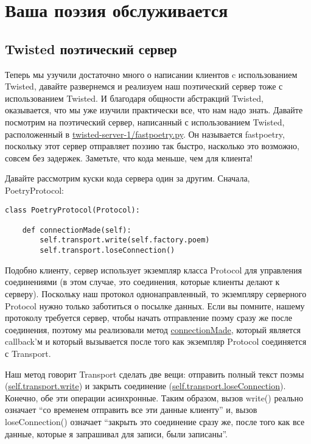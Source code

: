 

\section{Ваша поэзия обслуживается\label{sec:part11}}

\subsection{Twisted поэтический сервер}


Теперь мы узучили достаточно много о написании клиентов c 
использованием Twisted, давайте развернемся и реализуем наш 
поэтический сервер тоже с использованием Twisted. И благодаря 
общности абстракций Twisted, оказывается, что  
мы уже изучили практически все, что нам надо знать. Давайте 
посмотрим на поэтический сервер, написанный с использованием 
Twisted, расположенный в \href{http://github.com/jdavisp3/twisted-intro/blob/master/twisted-server-1/fastpoetry.py#L1}{twisted-server-1/fastpoetry.py}. Он называется fastpoetry, 
поскольку этот сервер отправляет поэзию так быстро, 
насколько это возможно, совсем без задержек. Заметьте, что 
кода меньше, чем для клиента!


Давайте рассмотрим куски кода сервера один за другим. Сначала, PoetryProtocol:

 \begin{verbatim}
class PoetryProtocol(Protocol):

    def connectionMade(self):
        self.transport.write(self.factory.poem)
        self.transport.loseConnection()
\end{verbatim} 


Подобно клиенту, сервер использует экземпляр класса Protocol 
для управления соединениями (в этом случае, это соединения, 
которые клиенты делают к серверу). Поскольку наш протокол 
однонаправленный, то экземпляру серверного Protocol нужно 
только заботиться о посылке данных. Если вы помните, нашему  
протоколу требуется сервер, чтобы начать отправление поэму 
сразу же после соединения, поэтому мы реализовали метод 
\href{http://twistedmatrix.com/trac/browser/tags/releases/twisted-8.2.0/twisted/internet/protocol.py#L351}{connectionMade}, который является callback'м и который вызывается 
после того как экземпляр Protocol 
соединяется с Transport.  


Наш метод говорит Transport сделать две вещи: отправить полный текст поэмы (\href{http://twistedmatrix.com/trac/browser/tags/releases/twisted-8.2.0/twisted/internet/interfaces.py#L1302}{self.transport.write}) и закрыть соединение \newline (\href{http://twistedmatrix.com/trac/browser/tags/releases/twisted-8.2.0/twisted/internet/interfaces.py#L1321}{self.transport.loseConnection}). Конечно, обе 
эти операции асинхронные. Таким образом, вызов write() реально означает ``со временем отправить все 
эти данные клиенту'' и, вызов loseConnection() означает ``закрыть это соединение 
сразу же, после того как все данные, которые я запрашивал для 
записи, были записаны''. 


